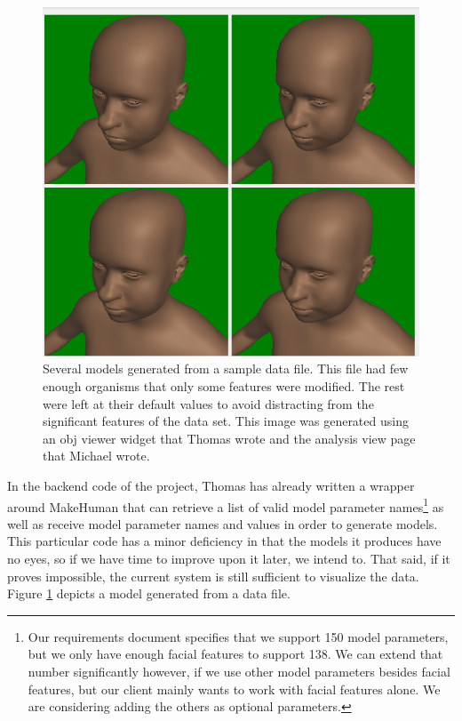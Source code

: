 \documentclass[letterpaper,10pt, onecolumn, draftclsnofoot]{IEEEtran}
\begin{document}
\begin{figure}
	\includegraphics[width=\textwidth]{analysis}
	\caption{Several models generated from a sample data file. This file had few enough organisms that only some features were modified. The rest were left at their default values to avoid distracting from the significant features of the data set. This image was generated using an obj viewer widget that Thomas wrote and the analysis view page that Michael wrote.}
	\label{fig:generated}
\end{figure}

In the backend code of the project, Thomas has already written a wrapper around MakeHuman that can retrieve a list of valid model parameter names\footnote{Our requirements document specifies that we support 150 model parameters, but we only have enough facial features to support 138. We can extend that number significantly however, if we use other model parameters besides facial features, but our client mainly wants to work with facial features alone. We are considering adding the others as optional parameters.} as well as receive model parameter names and values in order to generate models. This particular code has a minor deficiency in that the models it produces have no eyes, so if we have time to improve upon it later, we intend to. That said, if it proves impossible, the current system is still sufficient to visualize the data. Figure \ref{fig:generated} depicts a model generated from a data file.
\end{document}
